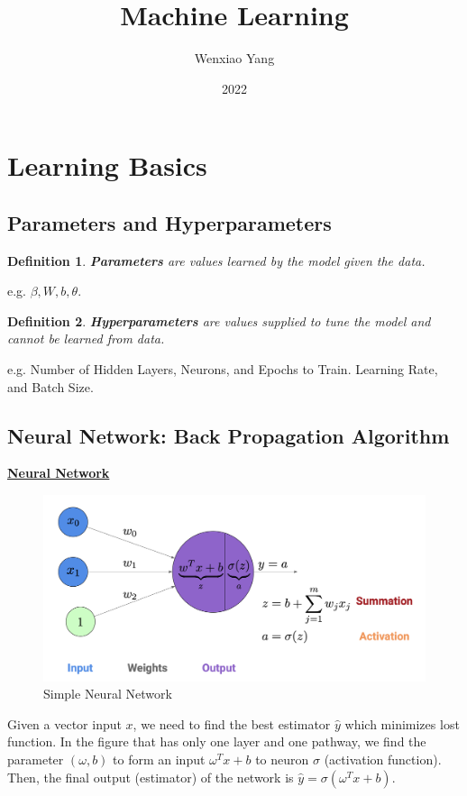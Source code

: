 \documentclass[11pt,a4paper]{article}
\title{\textbf{Machine Learning}}
\author[*]{Wenxiao Yang}
\affil[*]{Department of Mathematics, University of Illinois at Urbana-Champaign}
\date{2022}
\newtheorem{definition}{Definition}
\begin{document}
\maketitle
\tableofcontents
\newpage

\section{Learning Basics}
\subsection{Parameters and Hyperparameters}
\begin{definition}
    \textbf{Parameters} are values learned by the model given the data.
\end{definition}
e.g. $\beta, W, b, \theta$.
\begin{definition}
    \textbf{Hyperparameters} are values supplied to tune the model and cannot be learned from data.
\end{definition}
e.g. Number of Hidden Layers, Neurons, and Epochs to Train. Learning Rate, and Batch Size.

\subsection{Neural Network: Back Propagation Algorithm}
\underline{\textbf{Neural Network}}
\begin{center}\begin{figure}[htbp]
    \centering
    \includegraphics[scale=0.2]{neuron1.png}
    \caption{Simple Neural Network}
    \label{}
\end{figure}\end{center}
Given a vector input $x$, we need to find the best estimator $\hat{y}$ which minimizes lost function. In the figure that has only one layer and one pathway, we find the parameter $(\omega,b)$ to form an input $\omega^Tx+b$ to neuron $\sigma$ (activation function).  Then, the final output (estimator) of the network is $\hat{y}=\sigma(\omega^Tx+b)$.
\end{document}
